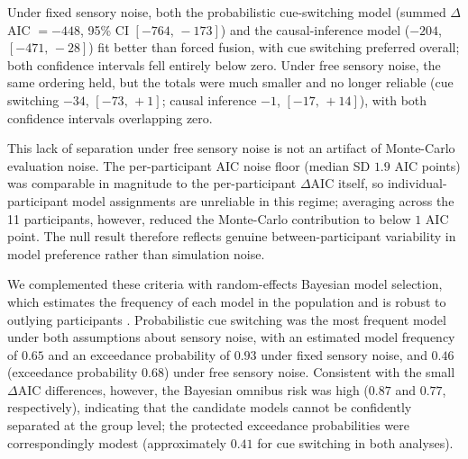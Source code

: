 \documentclass{biorxiv}
\providecommand{\citep}[1]{\cite{#1}}
\begin{document}
Under fixed sensory noise, both the probabilistic cue-switching model (summed $\Delta$AIC $= -448$, 95\% CI $[-764,\,-173]$) and the causal-inference model ($-204$, $[-471,\,-28]$) fit better than forced fusion, with cue switching preferred overall; both confidence intervals fell entirely below zero. Under free sensory noise, the same ordering held, but the totals were much smaller and no longer reliable (cue switching $-34$, $[-73,\,+1]$; causal inference $-1$, $[-17,\,+14]$), with both confidence intervals overlapping zero.

This lack of separation under free sensory noise is not an artifact of Monte-Carlo evaluation noise. The per-participant AIC noise floor (median SD $1.9$ AIC points) was comparable in magnitude to the per-participant $\Delta$AIC itself, so individual-participant model assignments are unreliable in this regime; averaging across the 11 participants, however, reduced the Monte-Carlo contribution to below $1$ AIC point. The null result therefore reflects genuine between-participant variability in model preference rather than simulation noise.



We complemented these criteria with random-effects Bayesian model selection, which estimates the frequency of each model in the population and is robust to outlying participants \citep{stephan2009bayesian,rigoux2014bayesian}. Probabilistic cue switching was the most frequent model under both assumptions about sensory noise, with an estimated model frequency of $0.65$ and an exceedance probability of $0.93$ under fixed sensory noise, and $0.46$ (exceedance probability $0.68$) under free sensory noise. Consistent with the small $\Delta$AIC differences, however, the Bayesian omnibus risk was high ($0.87$ and $0.77$, respectively), indicating that the candidate models cannot be confidently separated at the group level; the protected exceedance probabilities were correspondingly modest (approximately $0.41$ for cue switching in both analyses).
\end{document}
